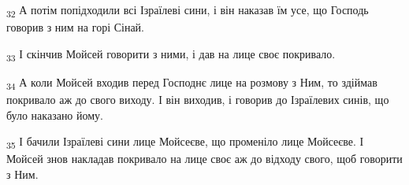 \begin{tcolorbox}
\textsubscript{32} А потім попідходили всі Ізраїлеві сини, і він наказав їм усе, що Господь говорив з ним на горі Сінай.
\end{tcolorbox}
\begin{tcolorbox}
\textsubscript{33} І скінчив Мойсей говорити з ними, і дав на лице своє покривало.
\end{tcolorbox}
\begin{tcolorbox}
\textsubscript{34} А коли Мойсей входив перед Господнє лице на розмову з Ним, то здіймав покривало аж до свого виходу. І він виходив, і говорив до Ізраїлевих синів, що було наказано йому.
\end{tcolorbox}
\begin{tcolorbox}
\textsubscript{35} І бачили Ізраїлеві сини лице Мойсеєве, що променіло лице Мойсеєве. І Мойсей знов накладав покривало на лице своє аж до відходу свого, щоб говорити з Ним.
\end{tcolorbox}
